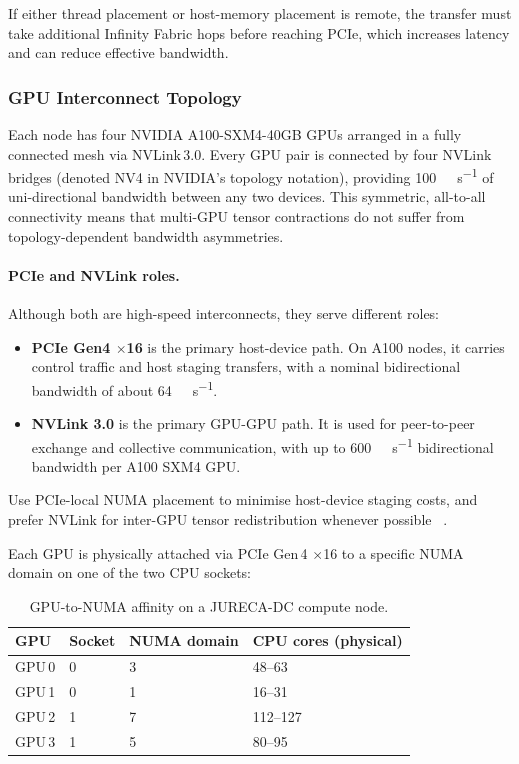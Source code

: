 If either thread placement or host-memory placement is remote, the transfer must
take additional Infinity Fabric hops before reaching PCIe, which increases
latency and can reduce effective bandwidth.

\subsubsection{GPU Interconnect Topology}

Each node has four NVIDIA A100-SXM4-40GB GPUs arranged in a fully connected mesh via NVLink\,3.0. Every GPU pair is connected by four NVLink bridges (denoted NV4 in NVIDIA's topology notation), providing \SI{100}{\giga\byte\per\second} of uni-directional bandwidth between any two devices. This symmetric, all-to-all connectivity means that multi-GPU tensor contractions do not suffer from topology-dependent bandwidth asymmetries.

\paragraph{PCIe and NVLink roles.}
Although both are high-speed interconnects, they serve different roles:
\begin{itemize}
  \item \textbf{PCIe Gen4 $\times$16} is the primary host-device path. On A100
  nodes, it carries control traffic and host staging transfers, with a nominal
  bidirectional bandwidth of about \SI{64}{\giga\byte\per\second}.
  \item \textbf{NVLink 3.0} is the primary GPU-GPU path. It is used for
  peer-to-peer exchange and collective communication, with up to
  \SI{600}{\giga\byte\per\second} bidirectional bandwidth per A100 SXM4 GPU.
\end{itemize}

Use PCIe-local NUMA placement to minimise host-device staging costs, and prefer
NVLink for inter-GPU tensor redistribution whenever possible
~\cite{nvidia-a100-product-specs,nvidia-cuda-guide}.

Each GPU is physically attached via PCIe Gen\,4 $\times$16 to a specific NUMA domain on one of the two CPU sockets:

\begin{table}[H]
\centering
\caption{GPU-to-NUMA affinity on a JURECA-DC compute node.}
\label{tab:gpu-numa-affinity}
\begin{tabular}{l l l l}
\toprule
GPU & Socket & NUMA domain & CPU cores (physical) \\
\midrule
GPU\,0 & 0 & 3 & 48--63 \\
GPU\,1 & 0 & 1 & 16--31 \\
GPU\,2 & 1 & 7 & 112--127 \\
GPU\,3 & 1 & 5 & 80--95 \\
\bottomrule
\end{tabular}
\end{table}

